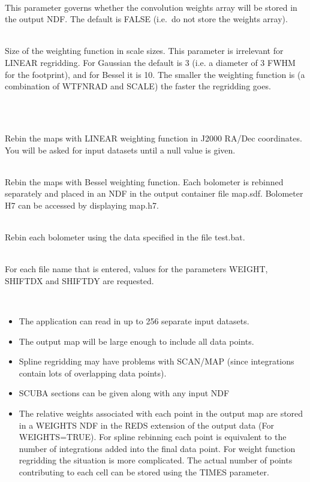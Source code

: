 \documentclass[twoside,11pt]{article}
\renewcommand{\_}{\texttt{\symbol{95}}}
\newlength{\sstexampleslength}
\newcommand{\sstexamples}[1]{
   \item[Examples:] \mbox{} \\
   \vspace{-3.5ex}
   \begin{description}
      #1
   \end{description}
}
\newcommand{\sstsubsection}[1]{ \item[{#1}] \mbox{} \\}
\newcommand{\sstexamplesubsection}[2]{\sloppy
\item[\parbox{\sstexampleslength}{\ssttt #1}] \mbox{} \vspace{1.0ex}
\\ #2 }
\newcommand{\sstnotes}[1]{\item[Notes:] \mbox{} \\[1.3ex] #1}
\newcommand{\sstitemlist}[1]{
  \mbox{} \\
  \vspace{-3.5ex}
  \begin{itemize}
     #1
  \end{itemize}
}
\newcommand{\sstitem}{\item}
\newcommand{\sstexamples}[1]{
      \item[Examples:] \\
      \begin{description}
         #1
      \end{description}
      \\
   }
\newcommand{\sstsubsection}[1]{\item[{#1}]}
\newcommand{\sstexamplesubsection}[2]{\item[{\ssttt #1}] #2}
\newcommand{\sstnotes}[1]{\item[Notes:] #1 }
\newcommand{\sstitemlist}[1]{
      \begin{itemize}
         #1
      \end{itemize}
      \\
   }
\newcommand{\sstitem}{\item}
\begin{document}
{{      \sstsubsection{
         WEIGHTS = LOGICAL (Read)
      }{
         This parameter governs whether the convolution weights array
         will be stored in the output NDF. The default is FALSE (i.e.\
         do not store the weights array).
      }
      \sstsubsection{
         WTFNRAD = INTEGER (Read)
      }{
        Size of the weighting function in scale sizes. This parameter
        is irrelevant for LINEAR regridding. For Gaussian the default
        is 3 (i.e. a diameter of 3 FWHM for the footprint), and for
        Bessel it is 10. The smaller the weighting function is (a
        combination of WTFNRAD and SCALE) the faster the regridding goes.
      }
   }
   \sstexamples{
      \sstexamplesubsection{
         bolrebin rebin\_method=LINEAR out\_coords=RJ
      }{
         Rebin the maps with LINEAR weighting function in J2000 RA/Dec
         coordinates. You will be asked for input datasets until a null
         value is given.
      }
      \sstexamplesubsection{
         bolrebin rebin\_method=BESSEL out=map
      }{
         Rebin the maps with Bessel weighting function. Each bolometer is
         rebinned separately and placed in an NDF in the output container file
         map.sdf. Bolometer H7 can be accessed by displaying map.h7.
      }
      \sstexamplesubsection{
         bolrebin noloop ref=test.bat
      }{
	Rebin each bolometer using the data specified in the file test.bat.
      }
   }
   \sstnotes{
      For each file name that is entered, values for the parameters
      WEIGHT, SHIFT\_DX and SHIFT\_DY are requested.
      \sstitemlist{

         \sstitem
         The application can read in up to 256 separate input datasets.

         \sstitem
         The output map will be large enough to include all data points.

         \sstitem
         Spline regridding may have problems with SCAN/MAP (since integrations
         contain lots of overlapping data points).

         \sstitem
         SCUBA sections can be given along with any input NDF

         \sstitem
         The relative weights associated with each point in the output map are
         stored in a WEIGHTS NDF in the REDS extension of the output data (For
         WEIGHTS=TRUE). For spline rebinning each point is equivalent to the
         number of integrations added into the final data point. For weight
         function regridding the situation is more complicated. The actual
         number of points contributing to each cell can be stored using the 
         TIMES parameter.

}}}
\end{document}
